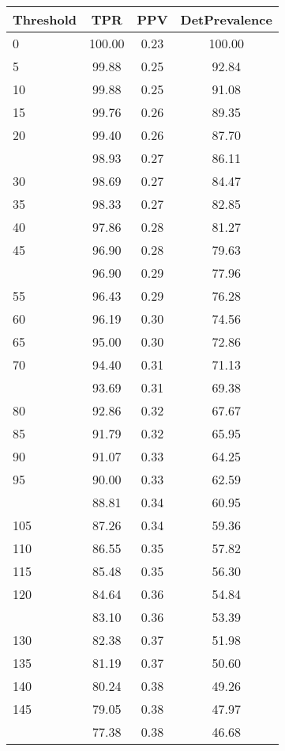 \begin{table}[ht]
\centering
\begin{tabular}{lccc}
  \toprule
Threshold & TPR & PPV & DetPrevalence \\ 
  \midrule
0 & 100.00 & 0.23 & 100.00 \\ 
  5 & 99.88 & 0.25 & 92.84 \\ 
  10 & 99.88 & 0.25 & 91.08 \\ 
  15 & 99.76 & 0.26 & 89.35 \\ 
  20 & 99.40 & 0.26 & 87.70 \\ 
   \addlinespace
25 & 98.93 & 0.27 & 86.11 \\ 
  30 & 98.69 & 0.27 & 84.47 \\ 
  35 & 98.33 & 0.27 & 82.85 \\ 
  40 & 97.86 & 0.28 & 81.27 \\ 
  45 & 96.90 & 0.28 & 79.63 \\ 
   \addlinespace
50 & 96.90 & 0.29 & 77.96 \\ 
  55 & 96.43 & 0.29 & 76.28 \\ 
  60 & 96.19 & 0.30 & 74.56 \\ 
  65 & 95.00 & 0.30 & 72.86 \\ 
  70 & 94.40 & 0.31 & 71.13 \\ 
   \addlinespace
75 & 93.69 & 0.31 & 69.38 \\ 
  80 & 92.86 & 0.32 & 67.67 \\ 
  85 & 91.79 & 0.32 & 65.95 \\ 
  90 & 91.07 & 0.33 & 64.25 \\ 
  95 & 90.00 & 0.33 & 62.59 \\ 
   \addlinespace
100 & 88.81 & 0.34 & 60.95 \\ 
  105 & 87.26 & 0.34 & 59.36 \\ 
  110 & 86.55 & 0.35 & 57.82 \\ 
  115 & 85.48 & 0.35 & 56.30 \\ 
  120 & 84.64 & 0.36 & 54.84 \\ 
   \addlinespace
125 & 83.10 & 0.36 & 53.39 \\ 
  130 & 82.38 & 0.37 & 51.98 \\ 
  135 & 81.19 & 0.37 & 50.60 \\ 
  140 & 80.24 & 0.38 & 49.26 \\ 
  145 & 79.05 & 0.38 & 47.97 \\ 
   \addlinespace
150 & 77.38 & 0.38 & 46.68 \\ 

\end{tabular}
\end{table}
